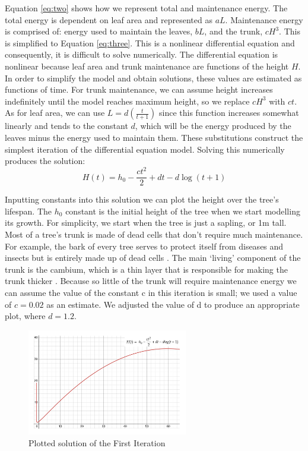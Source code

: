 \documentclass[twocolumn]{article} %
\begin{document}
Equation \ref{eq:two} shows how we represent total and maintenance energy. The total energy is dependent on leaf area and represented as $aL$. Maintenance energy is comprised of: energy used to maintain the leaves, $bL$, and the trunk, $cH^3$. This is simplified to Equation \ref{eq:three}. This is a nonlinear differential equation and consequently, it is difficult to solve numerically. The differential equation is nonlinear because leaf area and trunk maintenance are functions of the height $H$.  In order to simplify the model and obtain solutions, these values are estimated as functions of time. For trunk maintenance, we can assume height increases indefinitely until the model reaches maximum height, so we replace $cH^3$ with $ct$. As for leaf area, we can use $L = d(\frac{t}{t+1})$ since this function increases somewhat linearly and tends to the constant $d$, which will be the energy produced by the leaves minus the energy used to maintain them. These substitutions construct the simplest iteration of the differential equation model. Solving this numerically produces the solution:
\begin{equation}
\label{eq:five}
    H(t) = h_0 - \frac{ct^2}{2} + dt - d \log(t+1)
\end{equation}

Inputting constants into this solution we can plot the height over the tree’s lifespan. The $h_0$ constant is the initial height of the tree when we start modelling its growth. For simplicity, we start when the tree is just a sapling, or 1m tall. Most of a tree’s trunk is made of dead cells that don’t require much maintenance. For example, the bark of every tree serves to protect itself from diseases and insects but is entirely made up of dead cells \cite{one}. The main ‘living’ component of the trunk is the cambium, which is a thin layer that is responsible for making the trunk thicker \cite{two}. Because so little of the trunk will require maintenance energy we can assume the value of the constant c in this iteration is small; we used a value of $c=0.02$ as an estimate. We adjusted the value of d to produce an appropriate plot, where $d=1.2$.

\begin{figure}[htp]
    \centering
    \includegraphics[width=7cm]{Figures/Figure1}
    \caption{Plotted solution of the First Iteration}
    \label{fig:firstsolution}
\end{figure}
\end{document}
